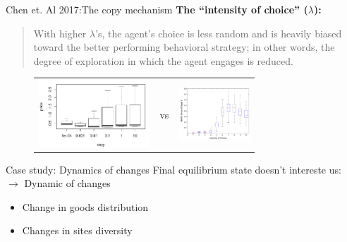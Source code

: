 \documentclass[12pt, notes=show]{beamer}
\begin{document}
\begin{frame}{Chen et. Al 2017:The copy mechanism}
    \textbf{ The ``intensity of choice'' ($\lambda$):}
    \begin{quote}
	\tiny
	 With higher $\lambda$'s, the agent’s choice is less random and is heavily
	 biased toward the better performing behavioral strategy; in other words, the degree of
	 exploration in which the agent engages is reduced. 
    \end{quote}
    \begin{figure}[htp]
	\begin{center}
	\begin{tabular}{m{4cm}cm{4cm}}
	   \includegraphics[height=2.5cm]{../images/PriceCopyAll.pdf} & vs  &
	     \includegraphics[height=2cm]{../images/chenetal_fig7.png} \\
	     \end{tabular}
	\end{center}
    \end{figure}
\end{frame}
\begin{frame}{Case study: Dynamics of changes}
    Final equilibrium state doesn't intereste us:\\

    {\centering $\rightarrow$ Dynamic of changes}

   
    \begin{itemize}
	\item Change in goods distribution
	\item Changes in sites diversity
    \end{itemize}
    
\end{frame}
\end{document}
